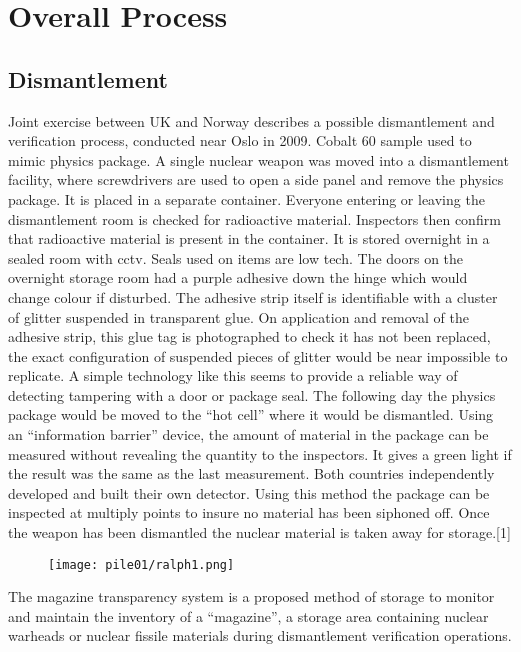 \documentclass[twocolumn,a4paper]{article}
\begin{document}
\section{Overall Process}
\subsection{Dismantlement}
Joint exercise between UK and Norway describes a possible dismantlement and 
verification process, conducted near Oslo in 2009. Cobalt 60 sample used to 
mimic physics package. A single nuclear weapon was moved into a dismantlement 
facility, where screwdrivers are used to open a side panel and remove the 
physics package. It is placed in a separate container. Everyone entering or 
leaving the dismantlement room is checked for radioactive material. Inspectors 
then confirm that radioactive material is present in the container. It is stored 
overnight in a sealed room with cctv. Seals used on items are low tech. The doors 
on the overnight storage room had a purple adhesive down the hinge which would 
change colour if disturbed. The adhesive strip itself is identifiable with a 
cluster of glitter suspended in transparent glue. On application and removal of 
the adhesive strip, this glue tag is photographed to check it has not been 
replaced, the exact configuration of suspended pieces of glitter would be near 
impossible to replicate. A simple technology like this seems to provide a reliable 
way of detecting tampering with a door or package seal. The following day the 
physics package would be moved to the ``hot cell'' where it would be dismantled. 
Using an ``information barrier'' device, the amount of material in the package can 
be measured without revealing the quantity to the inspectors. It gives a green 
light if the result was the same as the last measurement. Both countries 
independently developed and built their own detector. Using this method the 
package can be inspected at multiply points to insure no material has been 
siphoned off. Once the weapon has been dismantled the nuclear material is taken 
away for storage.[1]

\begin{figure}
  \texttt{[image: pile01/ralph1.png]}
\end{figure}

The magazine transparency system is a proposed method of storage to monitor and 
maintain the inventory of a ``magazine'', a storage area containing nuclear warheads 
or nuclear fissile materials during dismantlement verification operations. 
\end{document}
